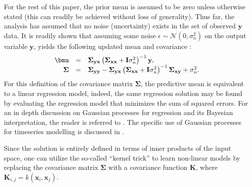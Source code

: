 \documentclass[useAMS,usenatbib,fleqn]{mn2e}
\begin{document}
For the rest of this paper, the prior mean is assumed to be zero unless otherwise stated (this can readily be achieved without loss of generality). Thus far, the analysis has assumed that no noise (uncertainty) exists in the set of observed $\mathbf{y}$ data. It is readily shown that assuming some noise $\epsilon \sim \mathcal{N}\left(0,\sigma_{n}^{2}\right)$ on the output variable $\mathbf{y}$, yields the following updated mean and covariance \citep{rasmussen2006gaussian}:
\begin{equation}
\label{eq-mean-variance-noise}
\begin{array}{rcl}
\bmu &=& \mathbf\Sigma_{\mathbf{y}\mathbf{x}}\left(\mathbf\Sigma_{\mathbf{x}\mathbf{x}}+\mathbf{I}\sigma_{n}^{2}\right)^{-1}\mathbf{y},\\
\mathbf\Sigma &=& \mathbf\Sigma_{\mathbf{y}\mathbf{y}}-\mathbf\Sigma_{\mathbf{y}\mathbf{x}}\left(\mathbf\Sigma_{\mathbf{x}\mathbf{x}}+\mathbf{I}\sigma_{n}^{2}\right)^{-1}\mathbf\Sigma_{\mathbf{x}\mathbf{y}}+\sigma_{n}^{2}.
\end{array}
\end{equation}
For this definition of the covariance matrix $\mathbf\Sigma$, the predictive mean is equivalent to a linear regression model, indeed, the same regression solution may be found by evaluating the regression model that minimizes the sum of squared errors. For an in depth discussion on Gaussian processes for regression and its Bayesian interpretation, the reader is referred to \citep{rasmussen2006gaussian}. The specific use of Gaussian processes for timeseries modelling is discussed in \citep{roberts2012rs}.

Since the solution is entirely defined in terms of inner products of the input space, one can utilize the so-called ``kernel trick'' to learn non-linear models by replacing the covariance matrix $\mathbf\Sigma$ with a covariance function $\mathbf{K}$, where $\mathbf{K}_{i,j} = k(\mathbf{x}_{i},\mathbf{x}_{j})$.
\end{document}
